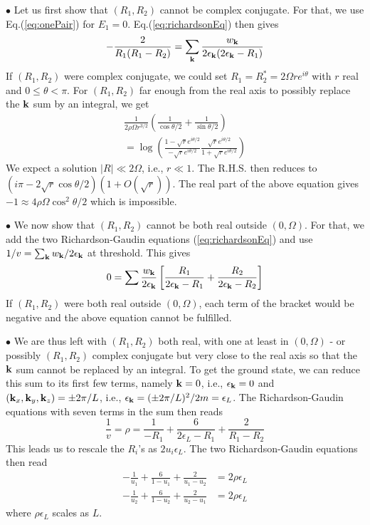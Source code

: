 \documentclass[5p,twocolumn]{elsarticle}
\begin{document}
$\bullet$ Let us first show that $(R_1,R_2)$ cannot be complex conjugate. For that, we use Eq.(\ref{eq:onePair}) for $E_1=0$. Eq.(\ref{eq:richardsonEq}) then gives
\begin{equation}
-\frac{2}{R_{1}(R_{1}-R_{2})}=\sum_{\mathbf{k}}\frac{w_{\mathbf{k}}}{2\epsilon_{\mathbf{k}}(2\epsilon_{\mathbf{k}}-R_{1})}
\end{equation}
If $(R_1,R_2)$ were complex conjugate, we could set $R_1=R^*_2=2 \Omega r e^{i\theta}$ with $r$ real and $0\leqslant\theta<\pi$. For $(R_1,R_2)$ far enough from the real axis to possibly replace the $\mathbf{k}$ sum by an integral, we get
\begin{multline}
\frac{1}{2\rho\Omega{r^{3/2}}}\left(\frac{1}{\cos\theta/2}+\frac{1}{\sin\theta/2}\right)\\
=\log\left(\frac{1-\sqrt{r}e^{i\theta/2}}{-\sqrt{r}e^{i\theta/2}}\frac{\sqrt{r}e^{i\theta/2}}{1+\sqrt{r}e^{i\theta/2}}\right)
\end{multline}
We expect a solution $|R|\ll2 \Omega$, i.e., $r\ll1$. The R.H.S. then reduces to 
$(i\pi-2\sqrt r\cos\theta/2)(1+O(\sqrt r))$. The real part of the above equation gives $-1\approx4 \rho \Omega\cos^2\theta/2$ which is impossible.


$\bullet$ We now show that $(R_1,R_2)$ cannot be both real outside $(0,\Omega)$. For that, we add the two Richardson-Gaudin equations (\ref{eq:richardsonEq}) and use $1/v=\sum_{\mathbf{k}}w_{\mathbf{k}}/2\epsilon_{\mathbf{k}}$ at threshold. This gives
\begin{equation}
0=\sum\frac{w_{\mathbf{k}}}{2\epsilon_{\mathbf{k}}}\left[\frac{R_{1}}{2\epsilon_{\mathbf{k}}-R_{1}}+\frac{R_{2}}{2\epsilon_{\mathbf{k}}-R_{2}}\right]
\end{equation}
If $(R_1,R_2)$ were both real outside $(0,\Omega)$, each term of the bracket would be negative and the above equation cannot be fulfilled.


$\bullet$ We are thus left with $(R_1,R_2)$ both real, with one at least in $(0,\Omega)$ - or possibly $(R_1,R_2)$ complex conjugate but very close to the real axis so that the $\mathbf{k}$ sum cannot be replaced by an integral. To get the ground state, we can reduce this sum to its first few terms, namely $\mathbf{k}=0$, i.e., $\epsilon_{\mathbf{k}}=0$ and
 $(\mathbf{k}_x,\mathbf{k}_y,\mathbf{k}_z)=\pm 2\pi/L
 $, i.e., $\epsilon_{\mathbf{k}}=(\pm 2\pi/L)^2/2m=\epsilon_L$. The Richardson-Gaudin equations with seven terms in the sum then reads
\begin{equation}
\frac{1}{v}=\rho=\frac{1}{-R_{1}}+\frac{6}{2\epsilon_{L}-R_{1}}+\frac{2}{R_{1}-R_{2}}
\end{equation}
This leads us to rescale the $R_i$'s as $2u_i\epsilon_L $. The two Richardson-Gaudin equations then read
\begin{equation}
\begin{split}
-\frac{1}{u_{1}}+\frac{6}{1-u_{1}}+\frac{2}{u_{1}-u_{2}}&=2\rho\epsilon_{L}\\
-\frac{1}{u_{2}}+\frac{6}{1-u_{2}}+\frac{2}{u_{2}-u_{1}}&=2\rho\epsilon_{L}
\end{split}\label{eq:t12}
\end{equation}
where $\rho\epsilon_L$ scales as $L$.
\end{document}

